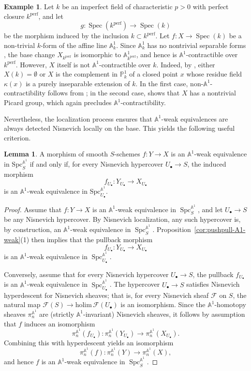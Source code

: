 \documentclass[10pt]{amsart}
\renewcommand{\AA}{\mathbb{A}}
\newcommand{\Spec}{\operatorname{Spec}}
\newcommand{\mcal}[1]{\mathcal{#1}}
\numberwithin{equation}{section} %
\theoremstyle{plain}
\theoremstyle{definition}
\newtheorem{lemma}[lemma]{Lemma}
\newtheorem{example}[example]{Example}
\theoremstyle{remark}
\newcommand{\Spc}{\operatorname{Spc}}
\newcommand{\PP}{\mathbb{P}}
\begin{document}
\begin{example}\label{ex:forms-A1}
Let $k$ be an imperfect field of characteristic $p>0$ with perfect closure $k^{\mathrm{perf}}$, and let 
\[
g:\Spec(k^{\mathrm{perf}})\to \Spec(k)
\]
be the morphism induced by the inclusion $k\subset k^{\mathrm{perf}}$.  
Let $f:X\to\Spec(k)$ be a non-trivial $k$-form of the affine line $\AA^1_k$. Since $\AA^1_k$ has no nontrivial separable forms \cite{russell1970forms}, the base change $X_{k^{\mathrm{perf}}}$ is isomorphic to $\AA^1_{k^{\mathrm{perf}}}$, and hence is $\AA^1$-contractible over $k^{\mathrm{perf}}$. However, $X$ itself is not $\AA^1$-contractible over $k$. Indeed, by \cite{russell1970forms}, either $X(k)=\emptyset$ or $X$ is the complement in $\PP^1_k$ of a closed point $x$ whose residue field $\kappa(x)$ is a purely inseparable extension of $k$. In the first case, non-$\mathbb{A}^1$-contractibility follows from ; in the second case, \cite[Theorem~4.1]{achet2017picard} shows that $X$ has a nontrivial Picard group, which again precludes $\AA^1$-contractibility.
\end{example}

Nevertheless, the localization process ensures that $\AA^1$-weak equivalences are always detected Nisnevich locally on the base. This yields the following useful criterion.

\begin{lemma}
\label{lem:A1-cont-local-on-base}
A morphism of smooth $S$-schemes $f:Y\to X$ is an $\AA^1$-weak equivalence in $\mathrm{Spc}_S^{\AA^1}$ if and only if, for every Nisnevich hypercover $U_{\bullet}\to S$, the induced morphism
\[
f_{U_{\bullet}}:Y_{U_{\bullet}}\to X_{U_{\bullet}}
\]
is an $\AA^1$-weak equivalence in $\mathrm{Spc}_{U_{\bullet}}^{\AA^1}$.
\end{lemma}

\begin{proof}
Assume that $f:Y\to X$ is an $\AA^1$-weak equivalence in $\Spc_S^{\AA^1}$, and let $U_{\bullet}\to S$ be any Nisnevich hypercover. By Nisnevich localization, any such hypercover is, by construction, an $\AA^1$-weak equivalence in $\Spc_S^{\AA^1}$. Proposition~\ref{cor:pushpull-A1-weak}(1) then implies that the pullback morphism 
\[
f_{U_{\bullet}}:Y_{U_{\bullet}}\to X_{U_{\bullet}}
\]
is an $\AA^1$-weak equivalence in $\Spc_{U_{\bullet}}^{\AA^1}$.
\medskip

Conversely, assume that for every Nisnevich hypercover $U_{\bullet}\to S$, the pullback $f_{U_{\bullet}}$ is an $\AA^1$-weak equivalence in $\Spc_{U_{\bullet}}^{\AA^1}$. The hypercover $U_{\bullet}\to S$ satisfies Nisnevich hyperdescent for Nisnevich sheaves; that is, for every Nisnevich sheaf $\mcal{F}$ on $S$, the natural map $\mcal{F}(S)\to \mathrm{holim}\,\mcal{F}(U_{\bullet})$ is an isomorphism. Since the $\AA^1$-homotopy sheaves $\pi_n^{\AA^1}$ are (strictly $\AA^1$-invariant) Nisnevich sheaves, it follows by assumption that $f$ induces an isomorphism
\[
\pi_n^{\AA^1}(f_{U_{\bullet}}): \pi_n^{\AA^1}(Y_{U_{\bullet}})\to \pi_n^{\AA^1}(X_{U_{\bullet}}).
\]
Combining this with hyperdescent yields an isomorphism 
\[
\pi_n^{\AA^1}(f): \pi_n^{\AA^1}(Y)\to \pi_n^{\AA^1}(X),
\]
and hence $f$ is an $\AA^1$-weak equivalence in $\Spc_S^{\AA^1}$.
\end{proof}
\end{document}
